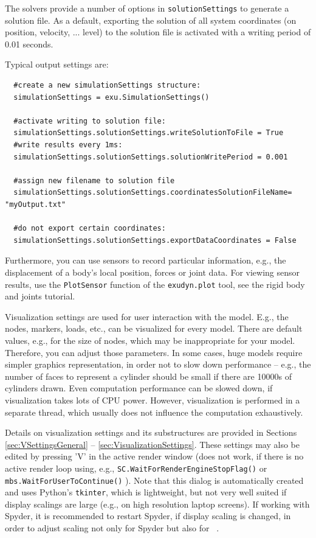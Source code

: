 %
The solvers provide a number of options in \texttt{solutionSettings} to generate a solution file. As a default, exporting the solution of all system coordinates (on position, velocity, ... level) to the solution file is activated with a writing period of 0.01 seconds.

\noindent Typical output settings are:
\pythonstyle\begin{lstlisting}
  #create a new simulationSettings structure:
  simulationSettings = exu.SimulationSettings()
  
  #activate writing to solution file:
  simulationSettings.solutionSettings.writeSolutionToFile = True
  #write results every 1ms:
  simulationSettings.solutionSettings.solutionWritePeriod = 0.001
  
  #assign new filename to solution file
  simulationSettings.solutionSettings.coordinatesSolutionFileName= "myOutput.txt"

  #do not export certain coordinates:
  simulationSettings.solutionSettings.exportDataCoordinates = False
\end{lstlisting}

Furthermore, you can use sensors to record particular information, e.g., the displacement of a body's local
position, forces or joint data. For viewing sensor results, use the \texttt{PlotSensor} function of the 
\texttt{exudyn.plot} tool, see the rigid body and joints tutorial.


\label{sec:introduction:visualizationSettings}
%
Visualization settings are used for user interaction with the model. E.g., the nodes, markers, loads, etc., can be visualized for every model. There are default values, e.g., for the size of nodes, which may be inappropriate for your model. Therefore, you can adjust those parameters. In some cases, huge models require simpler graphics representation, in order not to slow down performance -- e.g., the number of faces to represent a cylinder should be small if there are 10000s of cylinders drawn. Even computation performance can be slowed down, if visualization takes lots of CPU power. However, visualization is performed in a separate thread, which usually does not influence the computation exhaustively.

Details on visualization settings and its substructures are provided in Sections \ref{sec:VSettingsGeneral} -- \ref{sec:VisualizationSettings}. These settings may also be edited by pressing 'V' in the active render window (does not work, if there is no active render loop using, e.g., \texttt{SC.WaitForRenderEngineStopFlag()} or 
\texttt{mbs.WaitForUserToContinue()} ).
Note that this dialog is automatically created and uses Python's \texttt{tkinter}, which is lightweight, but not very well suited if display scalings are large (e.g., on high resolution laptop screens). If working with Spyder, it is recommended to restart Spyder, if display scaling is changed, in order to adjust scaling not only for Spyder but also for \codeName\ .

